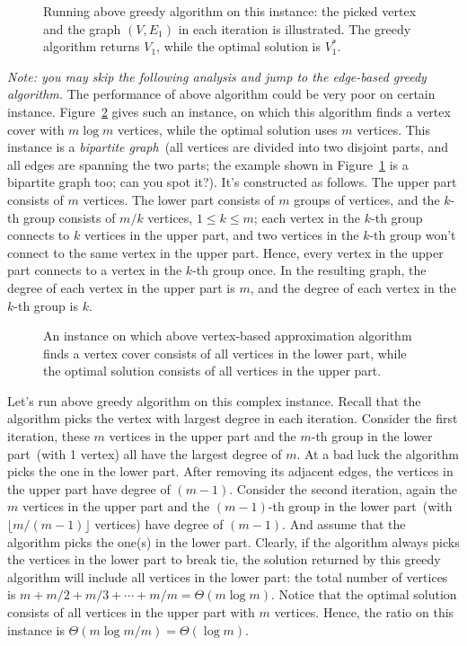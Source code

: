 \begin{figure}[h]
\centering{}
\caption{Running above greedy algorithm on this instance:
	the picked vertex and the graph $(V, E_1)$
	in each iteration is illustrated. 
The greedy algorithm returns $V_1$, while the optimal solution is $V_1^*$.}
\label{fig:greedy1}
\end{figure}

\emph{Note: you may skip the following analysis and jump to the edge-based greedy algorithm.}
The performance of above algorithm could be very poor on certain instance.
Figure~\ref{fig:logn} gives such an instance, on which this algorithm
finds a vertex cover with $m\log m$ vertices, while the optimal solution
uses $m$ vertices. This instance is a \emph{bipartite graph}~(all vertices
are divided into two disjoint parts, and all edges are spanning the two parts;
the example shown in Figure~\ref{fig:greedy1} is a bipartite graph too; can you spot it?).
It's constructed as follows. The upper part consists of $m$ vertices.
The lower part consists of $m$ groups of vertices, and the $k$-th group
consists of $m/k$ vertices, $1\le k \le m$; 
each vertex in the $k$-th group connects to $k$ vertices
in the upper part, and two vertices in the $k$-th group
won't connect to the same vertex in the upper part.
Hence, every vertex in the upper part connects to a vertex in the $k$-th group once.
In the resulting graph, the degree of each vertex in the upper part is $m$,
and the degree of each vertex in the $k$-th group is $k$.

\begin{figure}[h]
\centering{}
\caption{An instance on which above vertex-based approximation 
algorithm finds a vertex cover consists of all vertices in the
lower part, while the optimal solution consists of all vertices
in the upper part.}
\label{fig:logn}
\end{figure}

Let's run above greedy algorithm on this complex instance.
Recall that the algorithm picks the vertex with largest degree in
each iteration. %
Consider the first iteration, 
these $m$ vertices in the upper part and the $m$-th group in the lower part~(with 1 vertex)
all have the largest degree of $m$.
At a bad luck the algorithm picks the one in the lower part.
After removing its adjacent edges, the vertices in the upper part
have degree of $(m-1)$.
Consider the second iteration,
again the $m$ vertices in the upper part and the $(m-1)$-th group in the lower part~(with $\lfloor m/(m-1) \rfloor$ vertices)
have degree of $(m-1)$.
And assume that the algorithm picks the one(s) in the lower part.
Clearly, if the algorithm always picks the vertices in the lower part
to break tie, the solution returned by this greedy algorithm will include all vertices in the lower part: the total
number of vertices is $m + m/2 + m/3 + \cdots + m/m = \Theta(m\log m)$.
Notice that the optimal solution consists of all vertices in the upper part with $m$ vertices.
Hence, the ratio on this instance is $\Theta(m\log m / m) = \Theta(\log m)$.

